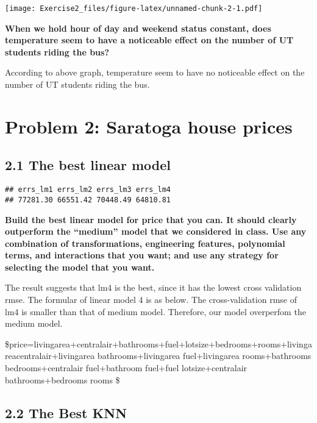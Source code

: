 \documentclass[
]{article}
\begin{document}
\texttt{[image: Exercise2\_files/figure-latex/unnamed-chunk-2-1.pdf]}

\textbf{When we hold hour of day and weekend status constant, does
temperature seem to have a noticeable effect on the number of UT
students riding the bus?}

According to above graph, temperature seem to have no noticeable effect
on the number of UT students riding the bus.

\hypertarget{problem-2-saratoga-house-prices}{%
\section{Problem 2: Saratoga house
prices}\label{problem-2-saratoga-house-prices}}

\hypertarget{the-best-linear-model}{%
\subsection{2.1 The best linear model}\label{the-best-linear-model}}

\begin{verbatim}
## errs_lm1 errs_lm2 errs_lm3 errs_lm4 
## 77281.30 66551.42 70448.49 64810.81
\end{verbatim}

\textbf{Build the best linear model for price that you can. It should
clearly outperform the ``medium'' model that we considered in class. Use
any combination of transformations, engineering features, polynomial
terms, and interactions that you want; and use any strategy for
selecting the model that you want.}

The result suggests that lm4 is the best, since it has the lowest cross
validation rmse. The formular of linear model 4 is as below. The
cross-validation rmse of lm4 is smaller than that of medium model.
Therefore, our model overperfom the medium model.

\$price=livingarea+centralair+bathrooms+fuel+lotsize+bedrooms+rooms+livingarea\times centralair+livingarea
\times bathrooms+livingarea \times fuel+livingarea
\times rooms+bathrooms \times bedrooms+centralair \times fuel+bathroom
\times fuel+fuel \times lotsize+centralair \times bathrooms+bedrooms
\times rooms \$

\hypertarget{the-best-knn}{%
\subsection{2.2 The Best KNN}\label{the-best-knn}}
\end{document}
